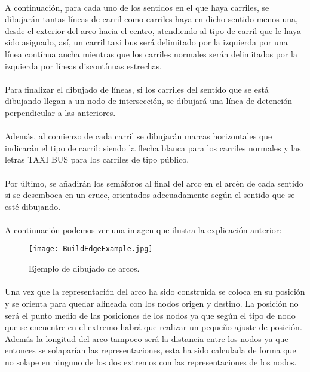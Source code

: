 	\paragraph{}
	A continuación, para cada uno de los sentidos en el que haya carriles, se dibujarán tantas líneas de carril como carriles haya en dicho sentido menos una, desde el exterior del arco hacia el centro, atendiendo al tipo de carril que le haya sido asignado, así, un carril taxi bus será delimitado por la izquierda por una línea contínua ancha mientras que los carriles normales serán delimitados por la izquierda por líneas discontínuas estrechas.
	\paragraph{}
	Para finalizar el dibujado de líneas, si los carriles del sentido que se está dibujando llegan a un nodo de intersección, se dibujará una línea de detención perpendicular a las anteriores.
	\paragraph{}
	Además, al comienzo de cada carril se dibujarán marcas horizontales que indicarán el tipo de carril: siendo la flecha blanca para los carriles normales y las letras TAXI BUS para los carriles de tipo público.
	\paragraph{}
	Por último, se añadirán los semáforos al final del arco en el arcén de cada sentido si se desemboca en un cruce, orientados adecuadamente según el sentido que se esté dibujando.
	\paragraph{}
	A continuación podemos ver una imagen que ilustra la explicación anterior:
	
	\begin{figure}[H]
		\centering
			\texttt{[image: BuildEdgeExample.jpg]}
	\caption{Ejemplo de dibujado de arcos.}
	\label{fig:BuildEdgeExample}
	\end{figure}
	
	\paragraph{}
	Una vez que la representación del arco ha sido construida se coloca en su posición y se orienta para quedar alineada con los nodos origen y destino. La posición no será el punto medio de las posiciones de los nodos ya que según el tipo de nodo que se encuentre en el extremo habrá que realizar un pequeño ajuste de posición. Además la longitud del arco tampoco será la distancia entre los nodos ya que entonces se solaparían las representaciones, esta ha sido calculada de forma que no solape en ninguno de los dos extremos con las representaciones de los nodos.
	
